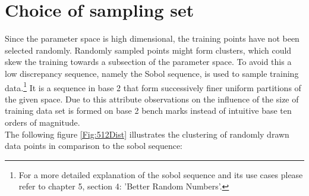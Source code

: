 	\section{Choice of sampling set}
		Since the parameter space is high dimensional, the training points have not been selected randomly. Randomly sampled points might form clusters, which could skew the training towards a subsection of the parameter space. To avoid this a low discrepancy sequence, namely the Sobol sequence, is used to sample training data.\footnote{For a more detailed explanation of the sobol sequence and its use cases please refer to \cite{ModernCompFinance} chapter 5, section 4: 'Better Random Numbers'.} It is a sequence in base 2 that form successively finer uniform partitions of the given space. Due to this attribute observations on the influence of the size of training data set is formed on base 2 bench marks instead of intuitive base ten orders of magnitude.\\
		The following figure \ref{Fig:512Dist} illustrates the clustering of randomly drawn data points in comparison to the sobol sequence:
